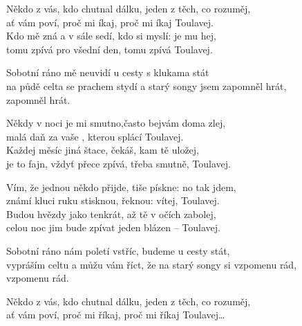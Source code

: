 
\ve{}
Někdo z vás, kdo chutnal dálku, jeden z těch, co rozuměj,\\
ať vám poví, proč mi íkaj, proč mi íkaj Toulavej.\\
Kdo mě zná a v sále sedí, kdo si myslí: je mu hej,\\
tomu zpívá pro všední den, tomu zpívá Toulavej.

\cho{}
Sobotní ráno mě neuvidí u cesty s klukama stát\\
na půdě celta se prachem stydí a starý songy jsem zapomněl hrát,\\
zapomněl hrát.

\ve{}
Někdy v noci je mi smutno,často bejvám doma zlej,\\
malá daň za vaše , kterou splácí Toulavej.\\
Každej měsíc jiná štace, čekáš, kam tě uložej,\\
je to fajn, vždyť přece zpívá, třeba smutně, Toulavej.

\cho{}

\ve{}
Vím, že jednou někdo přijde, tiše pískne: no tak jdem,\\
známí kluci ruku stisknou, řeknou: vítej, Toulavej.\\
Budou hvězdy jako tenkrát, až tě v očích zabolej,\\
celou noc jim bude zpívat jeden blázen -- Toulavej.

\cho{}
Sobotní ráno nám poletí vstříc, budeme u cesty stát,\\
vypráším celtu a můžu vám říct, že na starý songy si vzpomenu rád,\\
vzpomenu rád.

\ve{}
Někdo z vás, kdo chutnal dálku, jeden z těch, co rozuměj,\\
ať vám poví, proč mi říkaj, proč mi říkaj Toulavej\ldots{}

\esong